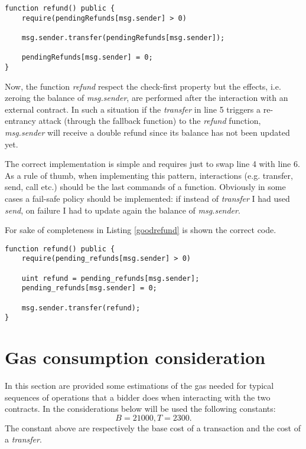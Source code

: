 \documentclass{article}
\begin{document}
\begin{lstlisting}[language=Solidity, caption={Buggy refund function, vulnerable to re-entrancy attacks},captionpos=b, label=badrefund]
 function refund() public {
    require(pendingRefunds[msg.sender] > 0)
    
    msg.sender.transfer(pendingRefunds[msg.sender]);
    
    pendingRefunds[msg.sender] = 0;
}
\end{lstlisting}

Now, the function \textit{refund} respect the check-first property but the effects, i.e. zeroing the balance of \textit{msg.sender}, are performed after the interaction with an external contract. In such a situation if the \textit{transfer} in line 5 triggers a re-entrancy attack (through the fallback function) to the \textit{refund} function, \textit{msg.sender} will receive a double refund since its balance has not been updated yet.

The correct implementation is simple and requires just to swap line 4 with line 6. As a rule of thumb, when implementing this pattern, interactions (e.g. transfer, send, call etc.) should be the last commands of a function. Obviously in some cases a fail-safe policy should be implemented: if instead of \textit{transfer} I had used \textit{send}, on failure I had to update again the balance of \textit{msg.sender}.

For sake of completeness in Listing \ref{goodrefund} is shown the correct code.

\begin{lstlisting}[language=Solidity, caption={Correct refund function. Since on failure \textit{transfer} revert the transaction there is no need to check its returned value.},captionpos=b, label=goodrefund]
 function refund() public {
    require(pending_refunds[msg.sender] > 0)
    
    uint refund = pending_refunds[msg.sender];
    pending_refunds[msg.sender] = 0;
    
    msg.sender.transfer(refund);
}
\end{lstlisting}

\section{Gas consumption consideration}\label{gas}
In this section are provided some estimations of the gas needed for typical sequences of operations that a bidder does when interacting with the two contracts. In the considerations below will be used the following constants:
$$ B=21000, T=2300.$$
The constant above are respectively the base cost of a transaction and the cost of a \textit{transfer}.
\end{document}
